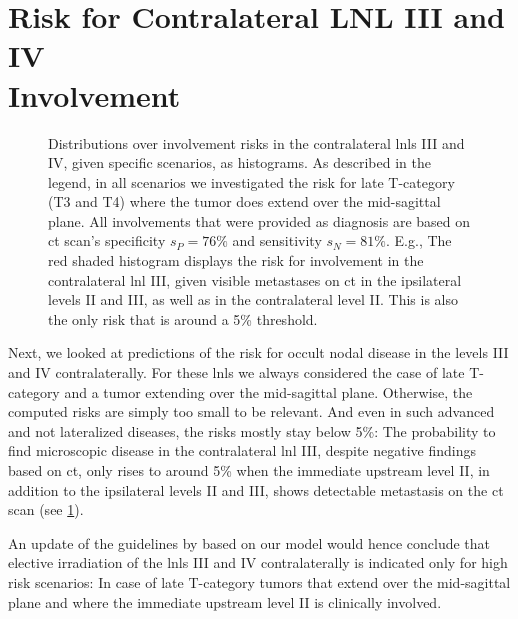 \documentclass[\relativeRoot/main.tex]{subfiles}
\begin{document}
\section[Risk for Contralateral LNL III and IV Involvement]{Risk for Contralateral LNL III and IV\\Involvement}
\label{sec:complete:contraIIIandIV}

\begin{figure}
    \centering
    \def\svgwidth{1.0\textwidth}
    
    \caption[
        complete model's risks for contra LNLs III \& IV
    ]{
        Distributions over involvement risks in the contralateral \glspl{lnl} III and IV, given specific scenarios, as histograms. As described in the legend, in all scenarios we investigated the risk for late T-category (T3 and T4) where the tumor does extend over the mid-sagittal plane. All involvements that were provided as diagnosis are based on \gls{ct} scan's specificity $s_P = 76\%$ and sensitivity $s_N = 81\%$. E.g., The red shaded histogram displays the risk for involvement in the contralateral \gls{lnl} III, given visible metastases on \gls{ct} in the ipsilateral levels II and III, as well as in the contralateral level II. This is also the only risk that is around a 5\% threshold.
    }
    \label{fig:complete:contraIIIandIV}
\end{figure}

Next, we looked at predictions of the risk for occult nodal disease in the levels III and IV contralaterally. For these \glspl{lnl} we always considered the case of late T-category and a tumor extending over the mid-sagittal plane. Otherwise, the computed risks are simply too small to be relevant. And even in such advanced and not lateralized diseases, the risks mostly stay below 5\%: The probability to find microscopic disease in the contralateral \gls{lnl} III, despite negative findings based on \gls{ct}, only rises to around 5\% when the immediate upstream level II, in addition to the ipsilateral levels II and III, shows detectable metastasis on the \gls{ct} scan (see \cref{fig:complete:contraIIIandIV}).

An update of the guidelines by  based on our model would hence conclude that elective irradiation of the \glspl{lnl} III and IV contralaterally is indicated only for high risk scenarios: In case of late T-category tumors that extend over the mid-sagittal plane and where the immediate upstream level II is clinically involved.
\end{document}
